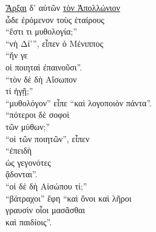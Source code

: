 {\large
\begin{greek}
\noindent \underline{ Ἄρξαι} δ' αὐτῶν \underline{τὸν Ἀπολλώνιον} \\
\tabto{2em} ὧδε ἐρόμενον τοὺς ἑταίρους \\
\tabto{4em} ``ἔστι τι μυθολογία;'' \\
``νὴ Δί'”, εἶπεν ὁ Μένιππος \\
\tabto{2em} ``ἥν γε \\
\tabto{2em} οἱ ποιηταὶ ἐπαινοῦσι''. \\
``τὸν δὲ δὴ Αἴσωπον \\
\tabto{2em} τί ἡγῇ;''\\
``μυθολόγον'' εἶπε ``καὶ λογοποιὸν πάντα''. \\
``πότεροι δὲ σοφοὶ \\
\tabto{2em} τῶν μύθων;''\\
``οἱ τῶν ποιητῶν'', εἶπεν \\
\tabto{2em} ``ἐπειδὴ \\
\tabto{4em} ὡς γεγονότες \\
\tabto{2em} ᾄδονται''. \\
``οἱ δὲ δὴ Αἰσώπου τί;''\\
``βάτραχοι” ἔφη ``καὶ ὄνοι καὶ λῆροι \\
\tabto{2em} γραυσὶν οἷοι μασᾶσθαι \\
\tabto{2em} καὶ παιδίοις''.\\

\end{greek}
}

